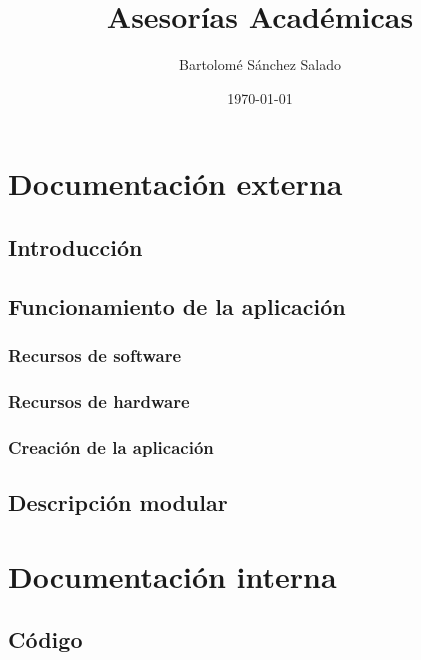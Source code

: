 \documentclass[a4paper,10pt,draft]{article}
\author{Bartolomé Sánchez Salado}
\title{Asesorías Académicas}
\date{\today}
\begin{document}
   \begin{titlepage}
      \maketitle
   \end{titlepage}

   \tableofcontents
   \newpage

   \section{Documentación externa}
      \subsection{Introducción}
      \subsection{Funcionamiento de la aplicación}
         \subsubsection{Recursos de software}
         \subsubsection{Recursos de hardware}
         \subsubsection{Creación de la aplicación}
      \subsection{Descripción modular}

   \section{Documentación interna}
      \subsection{Código}
\end{document}
